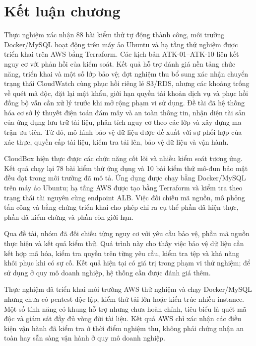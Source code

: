 \section{Kết luận chương}
Thực nghiệm xác nhận 88 bài kiểm thử tự động thành công, môi trường Docker/MySQL hoạt động trên máy ảo Ubuntu và hạ tầng thử nghiệm được triển khai trên AWS bằng Terraform. Các kịch bản ATK-01--ATK-10 liên kết nguy cơ với phản hồi của kiểm soát. Kết quả hỗ trợ đánh giá nền tảng chức năng, triển khai và một số lớp bảo vệ; đợt nghiệm thu bổ sung xác nhận chuyển trạng thái CloudWatch cùng phục hồi riêng lẻ S3/RDS, nhưng các khoảng trống về quét mã độc, đặt lại mật khẩu, giới hạn quyền tài khoản dịch vụ và phục hồi đồng bộ vẫn cần xử lý trước khi mở rộng phạm vi sử dụng.
Đề tài đã hệ thống hóa cơ sở lý thuyết điện toán đám mây và an toàn thông tin, nhận diện tài sản của ứng dụng lưu trữ tài liệu, phân tích nguy cơ theo các lớp và xây dựng ma trận ưu tiên. Từ đó, mô hình bảo vệ dữ liệu được đề xuất với sự phối hợp của xác thực, quyền cấp tài liệu, kiểm tra tải lên, bảo vệ dữ liệu và vận hành.

CloudBox hiện thực được các chức năng cốt lõi và nhiều kiểm soát tương ứng. Kết quả chạy lại 78 bài kiểm thử ứng dụng và 10 bài kiểm thử mô-đun bảo mật đều đạt trong môi trường đã mô tả. Ứng dụng được chạy bằng Docker/MySQL trên máy ảo Ubuntu; hạ tầng AWS được tạo bằng Terraform và kiểm tra theo trạng thái tài nguyên cùng endpoint ALB. Việc đối chiếu mã nguồn, mô phỏng tấn công và bằng chứng triển khai cho phép chỉ ra cụ thể phần đã hiện thực, phần đã kiểm chứng và phần còn giới hạn.

Qua đề tài, nhóm đã đối chiếu từng nguy cơ với yêu cầu bảo vệ, phần mã nguồn thực hiện và kết quả kiểm thử. Quá trình này cho thấy việc bảo vệ dữ liệu cần kết hợp mã hóa, kiểm tra quyền trên từng yêu cầu, kiểm tra tệp và khả năng khôi phục khi có sự cố. Kết quả hiện tại có giá trị trong phạm vi thử nghiệm; để sử dụng ở quy mô doanh nghiệp, hệ thống cần được đánh giá thêm.

Thực nghiệm đã triển khai môi trường AWS thử nghiệm và chạy Docker/MySQL nhưng chưa có pentest độc lập, kiểm thử tải lớn hoặc kiến trúc nhiều instance. Một số tính năng có khung hỗ trợ nhưng chưa hoàn chỉnh, tiêu biểu là quét mã độc và giám sát đầy đủ vòng đời tài liệu. Kết quả AWS chỉ xác nhận các điều kiện vận hành đã kiểm tra ở thời điểm nghiệm thu, không phải chứng nhận an toàn hay sẵn sàng vận hành ở quy mô doanh nghiệp.

